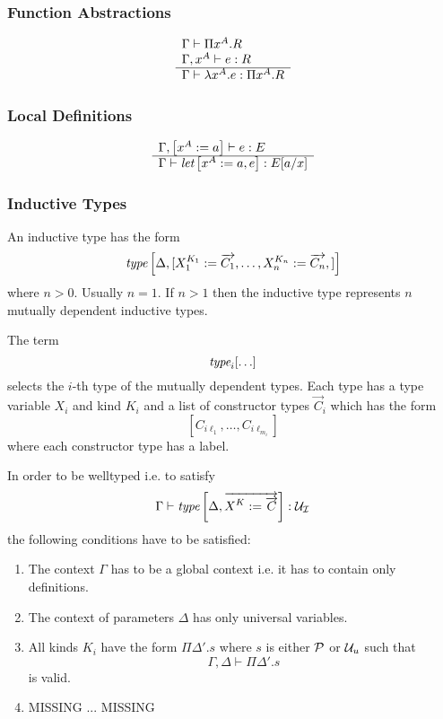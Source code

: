 \subsubsection{Function Abstractions}


$$
\begin{array}{l} 
    \Gamma \vdash \Pi x^A.R
    \\
    \Gamma, x^A \vdash e: R
 \\ \hline 
    \Gamma \vdash \lambda x^A. e : \Pi x^A. R
 \end{array}
$$







\subsubsection{Local Definitions}

$$
\begin{array}{l} 
    \Gamma, \left[ {x^A := a} \right] \vdash e : E
 \\ \hline 
    \Gamma \vdash {\text{\it let}} \left[ {x^A := a, e} \right] : E[a/x]
 \end{array}
$$





\subsubsection{Inductive Types}

An inductive type has the form
$$
{\text{\it type}} \left[ {
    \Delta,
    [
        X_1^{K_1} := {\overrightarrow {C_1}},
        \ldots,
        X_n^{K_n} := {\overrightarrow {C_n}},
    ]
} \right]
$$
where $n > 0$. Usually $n = 1$. If $n > 1$ then the inductive type represents
$n$ mutually dependent inductive types.

The term
$$
    {\text{\it type}}_i [\ldots]
$$
selects the $i$-th type of the mutually dependent types. Each type has a type
variable $X_i$ and kind $K_i$ and a list of constructor types $\vec C_i$ which
has the form
$$
    [
        C_{i \ell_1},
        \ldots,
        C_{i \ell_{m_i}}
    ]
$$
where each constructor type has a label.

In order to be welltyped i.e. to satisfy
$$
    \Gamma
    \vdash
    {\text{\it type}} \left[ {
        \Delta,
        {\overrightarrow {
            X^K := {\overrightarrow {C}}
        }}
    } \right]
    :
    {{\mathcal U}_\mathcal I}
$$
the following conditions have to be satisfied:

\begin{enumerate}

    \item The context $\Gamma$ has to be a global context i.e. it has to contain
        only definitions.

    \item The context of parameters $\Delta$ has only universal variables.

    \item All kinds $K_i$ have the form $\Pi \Delta'. s$ where $s$ is either
        ${\mathcal P}$ or ${\mathcal U}_u$ such that
        $$
            \Gamma, \Delta \vdash \Pi \Delta'. s
        $$
        is valid.

    \item MISSING ... MISSING
\end{enumerate}


